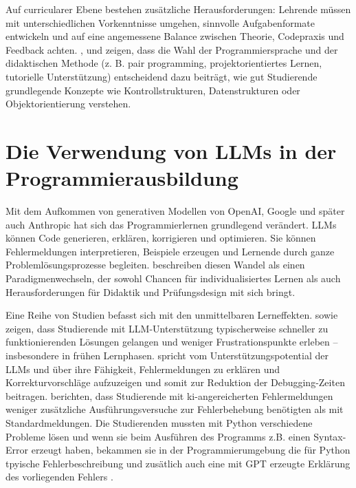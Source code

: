 Auf curricularer Ebene bestehen zusätzliche Herausforderungen: Lehrende müssen mit unterschiedlichen Vorkenntnisse umgehen, sinnvolle Aufgabenformate entwickeln und auf eine angemessene Balance zwischen Theorie, Codepraxis und Feedback achten. \textcite[S.~7]{SystematicReviewFinnland}, \textcite[S.~7-8]{DesigningAndDeploying} und \textcite[S.~15-16]{Lahtinen2005Difficulties} zeigen, dass die Wahl der Programmiersprache und der didaktischen Methode (z. B. pair programming, projektorientiertes Lernen, tutorielle Unterstützung) entscheidend dazu beiträgt, wie gut Studierende grundlegende Konzepte wie Kontrollstrukturen, Datenstrukturen oder Objektorientierung verstehen.


\section{Die Verwendung von LLMs in der Programmierausbildung}
Mit dem Aufkommen von generativen Modellen von OpenAI, Google und später auch Anthropic hat sich das Programmierlernen grundlegend verändert. LLMs können Code generieren, erklären, korrigieren und optimieren. Sie können Fehlermeldungen interpretieren, Beispiele erzeugen und Lernende durch ganze Problemlösungsprozesse begleiten. \textcite[S.~1]{DennyEra} beschreiben diesen Wandel als einen Paradigmenwechseln, der sowohl Chancen für individualisiertes Lernen als auch Herausforderungen für Didaktik und Prüfungsdesign mit sich bringt.

Eine Reihe von Studien befasst sich mit den unmittelbaren Lerneffekten. \textcite[S.~1]{RobotsAreComming} sowie \textcite[S.~1]{KazemitabaarCodeAid} zeigen, dass Studierende mit LLM-Unterstützung typischerweise schneller zu funktionierenden Lösungen gelangen und weniger Frustrationspunkte erleben -- insbesondere in frühen Lernphasen. \textcite[S.~565-56]{LeinonenErrorMessages} spricht vom Unterstützungspotential der LLMs und über ihre Fähigkeit, Fehlermeldungen zu erklären und Korrekturvorschläge aufzuzeigen und somit zur Reduktion der Debugging-Zeiten beitragen. \textcite{wang_large_2024} berichten, dass Studierende mit ki-angereicherten Fehlermeldungen weniger zusätzliche Ausführungsversuche zur Fehlerbehebung benötigten als mit Standardmeldungen. Die Studierenden mussten mit Python verschiedene Probleme lösen und wenn sie beim Ausführen des Programms z.B. einen Syntax-Error erzeugt haben, bekammen sie in der Programmierumgebung die für Python tpyische Fehlerbeschreibung und zusätlich auch eine mit GPT erzeugte Erklärung des vorliegenden Fehlers \parencite[S.~1395-1397]{wang_large_2024}.

